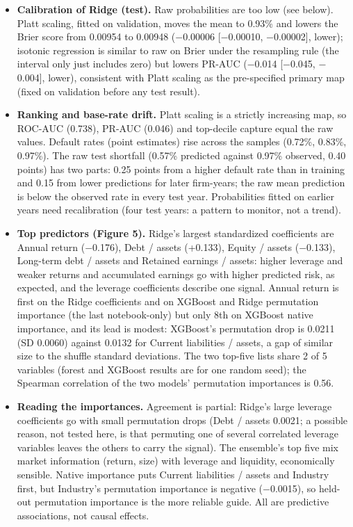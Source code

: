 \documentclass[9pt,letterpaper]{extarticle}
\begin{document}
\begin{itemize}
  \item \textbf{Calibration of Ridge (test).} Raw probabilities are too low (see below). Platt scaling, fitted on validation, moves the mean to 0.93\% and lowers the Brier score from 0.00954 to 0.00948 ($-$0.00006 [$-$0.00010, $-$0.00002], lower); isotonic regression is similar to raw on Brier under the resampling rule (the interval only just includes zero) but lowers PR-AUC ($-$0.014 [$-$0.045, $-$0.004], lower), consistent with Platt scaling as the pre-specified primary map (fixed on validation before any test result).
  \item \textbf{Ranking and base-rate drift.} Platt scaling is a strictly increasing map, so ROC-AUC (0.738), PR-AUC (0.046) and top-decile capture equal the raw values. Default rates (point estimates) rise across the samples (0.72\%, 0.83\%, 0.97\%). The raw test shortfall (0.57\% predicted against 0.97\% observed, 0.40 points) has two parts: 0.25 points from a higher default rate than in training and 0.15 from lower predictions for later firm-years; the raw mean prediction is below the observed rate in every test year. Probabilities fitted on earlier years need recalibration (four test years: a pattern to monitor, not a trend).
  \item \textbf{Top predictors (Figure 5).} Ridge's largest standardized coefficients are Annual return ($-$0.176), Debt / assets (+0.133), Equity / assets ($-$0.133), Long-term debt / assets and Retained earnings / assets: higher leverage and weaker returns and accumulated earnings go with higher predicted risk, as expected, and the leverage coefficients describe one signal. Annual return is first on the Ridge coefficients and on XGBoost and Ridge permutation importance (the last notebook-only) but only 8th on XGBoost native importance, and its lead is modest: XGBoost's permutation drop is 0.0211 (SD 0.0060) against 0.0132 for Current liabilities / assets, a gap of similar size to the shuffle standard deviations. The two top-five lists share 2 of 5 variables (forest and XGBoost results are for one random seed); the Spearman correlation of the two models' permutation importances is 0.56.
  \item \textbf{Reading the importances.} Agreement is partial: Ridge's large leverage coefficients go with small permutation drops (Debt / assets 0.0021; a possible reason, not tested here, is that permuting one of several correlated leverage variables leaves the others to carry the signal). The ensemble's top five mix market information (return, size) with leverage and liquidity, economically sensible. Native importance puts Current liabilities / assets and Industry first, but Industry's permutation importance is negative ($-$0.0015), so held-out permutation importance is the more reliable guide. All are predictive associations, not causal effects.
\end{itemize}
\end{document}
